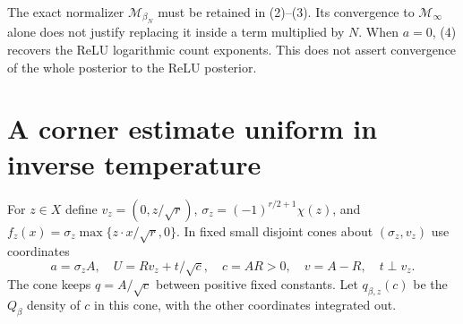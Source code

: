 \documentclass[11pt]{article}
\begin{document}
The exact normalizer $\mathcal M_{\beta_N}$ must be retained in
(2)--(3). Its convergence to $\mathcal M_\infty$ alone does not justify
replacing it inside a term multiplied by $N$. When $a=0$, (4) recovers
the ReLU logarithmic count exponents. This does not assert convergence
of the whole posterior to the ReLU posterior.

\section{A corner estimate uniform in inverse temperature}
For $z\in X$ define $v_z=(0,z/\sqrt r)$,
$\sigma_z=(-1)^{r/2+1}\chi(z)$, and
$f_z(x)=\sigma_z\max\{z\cdot x/\sqrt r,0\}$.
In fixed small disjoint cones about $(\sigma_z,v_z)$ use coordinates
\[
 a=\sigma_z A,\quad U=Rv_z+t/\sqrt c,\quad
 c=AR>0,\quad v=A-R,\quad t\perp v_z.
\]
The cone keeps $q=A/\sqrt c$ between positive fixed constants.
Let $q_{\beta,z}(c)$ be the $Q_\beta$ density of $c$ in this cone,
with the other coordinates integrated out.
\end{document}
